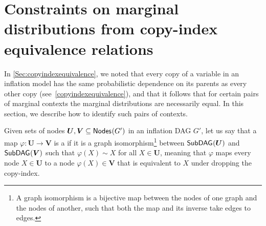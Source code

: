 \documentclass[aps,english,superscriptaddress,onecolumn,twoside,longbibliography,pra,floatfix,fleqn,nofootinbib]{revtex4-1}%
\newcommand*{\tblue}[1]{{\color{MidnightBlue}{\textbf{#1}}}}
\theoremstyle{definition}
\newcommand{\pfunc}[1]{P_{#1}}
\newcommand{\SmallNamedFunction}[3][]{\operatorname{\mathsf{#2}}_{#1}\parenths{#3}}
\newcommand{\subgraph}[2][]{\SmallNamedFunction[#1]{SubDAG}{#2}}
\newcommand{\nodes}[1]{\SmallNamedFunction{Nodes}{#1}}
\DeclarePairedDelimiter{\parenths}{\lparen}{\rparen}
\begin{document}











\section{Constraints on marginal distributions from copy-index equivalence relations}\label{sec:coincidingdetails}


In \cref{Sec:copyindexequivalence}, we noted that every copy of a variable in an inflation model has the same probabilistic dependence on its parents as every other copy (see~\cref{copyindexequivalence}), and that it follows that for certain pairs of marginal contexts the marginal distributions are necessarily equal.  In this section, we describe how to identify such pairs of contexts. 


Given sets of nodes $\bm{U},\bm{V}\subseteq\nodes{G'}$ in an inflation DAG $G'$, let us say that a map $\varphi:\bm{U}\to\bm{V}$ is a \tblue{copy isomorphism} if it is a graph isomorphism\footnote{A graph isomorphism is a bijective map between the nodes of one graph and the nodes of another, such that both the map and its inverse take edges to edges.} between $\subgraph{\bm{U}}$ and $\subgraph{\bm{V}}$ such that $\varphi(X)\sim X$ for all $X\in\bm{U}$, meaning that $\varphi$ maps every node $X\in\bm{U}$ to a node $\varphi(X)\in\bm{V}$ that is equivalent to $X$ under dropping the copy-index. %
\end{document}
